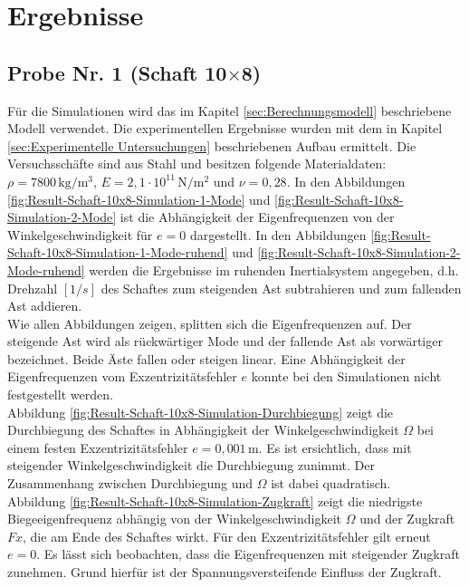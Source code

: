 	\pagestyle{fancy}
	\section{Ergebnisse} \label{sec:Ergebnisse}
	\subsection{Probe Nr. 1 (Schaft 10$\times$8)}
	Für die Simulationen wird das im Kapitel \ref{sec:Berechnungsmodell} beschriebene Modell verwendet. Die experimentellen Ergebnisse wurden mit dem in Kapitel  \ref{sec:Experimentelle Untersuchungen} beschriebenen Aufbau ermittelt. Die Versuchsschäfte sind aus Stahl und besitzen folgende Materialdaten: $\rho = 7800 \,\text{kg}/\text{m}^{3} $, $ E=2,1\cdot 10^{11} \,\text{N}/\text{m}^{2} $ und $ \nu=0,28 $. In den Abbildungen \ref{fig:Result-Schaft-10x8-Simulation-1-Mode} und \ref{fig:Result-Schaft-10x8-Simulation-2-Mode} ist die Abhängigkeit der Eigenfrequenzen von der Winkelgeschwindigkeit für $ e=0 $ dargestellt. In den Abbildungen \ref{fig:Result-Schaft-10x8-Simulation-1-Mode-ruhend} und \ref{fig:Result-Schaft-10x8-Simulation-2-Mode-ruhend} werden die Ergebnisse im ruhenden Inertialsystem angegeben, d.h. Drehzahl $ [1/s] $ des Schaftes zum steigenden Ast subtrahieren und zum fallenden Ast addieren.\\
	
	Wie allen Abbildungen zeigen, splitten sich die Eigenfrequenzen auf. Der steigende Ast wird als rückwärtiger Mode und der fallende Ast als vorwärtiger bezeichnet. Beide Äste fallen oder steigen linear. Eine Abhängigkeit der Eigenfrequenzen vom Exzentrizitätsfehler $ e $ konnte bei den Simulationen nicht festgestellt werden.\\
	
	Abbildung \ref{fig:Result-Schaft-10x8-Simulation-Durchbiegung} zeigt die Durchbiegung des Schaftes in Abhängigkeit der Winkelgeschwindigkeit $ \Omega $ bei einem festen Exzentrizitätsfehler $ e=0,001\,\text{m}$. Es ist ersichtlich, dass mit steigender Winkelgeschwindigkeit die Durchbiegung zunimmt. Der Zusammenhang zwischen Durchbiegung und $\Omega$ ist dabei quadratisch.\\
	
	Abbildung \ref{fig:Result-Schaft-10x8-Simulation-Zugkraft} zeigt die niedrigste Biegeeigenfrequenz abhängig von der Winkelgeschwindigkeit $ \Omega $ und der Zugkraft $ Fx $, die am Ende des Schaftes wirkt. Für den Exzentrizitätsfehler gilt erneut $ e=0 $. Es lässt sich beobachten, dass die Eigenfrequenzen mit steigender Zugkraft zunehmen. Grund hierfür ist der Spannungsversteifende Einfluss der Zugkraft.
	
